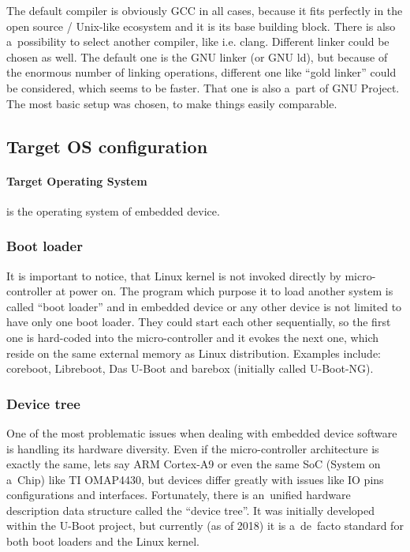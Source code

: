 \documentclass[printmode]{mgr}
\begin{document}
The default compiler is obviously GCC in all cases, because it fits perfectly in the open source / Unix-like ecosystem and it is its base building block. There is also a~possibility to select another compiler, like i.e. clang. Different linker could be chosen as well. The default one is the GNU linker (or GNU ld), but because of the enormous number of linking operations, different one like ``gold linker'' could be considered, which seems to be faster. That one is also a~part of GNU Project. The most basic setup was chosen, to make things easily comparable. 


\subsection{Target OS configuration}

\paragraph{Target Operating System} is the operating system of embedded device.

\subsubsection{Boot loader}
It is important to notice, that Linux kernel is not invoked directly by micro-controller at power on. The program which purpose it to load another system is called ``boot loader'' and in embedded device or any other device is not limited to have only one boot loader. They could start each other sequentially, so the first one is hard-coded into the micro-controller and it evokes the next one, which reside on the same external memory as Linux distribution. Examples include: coreboot, Libreboot, Das U-Boot and barebox (initially called U-Boot-NG).

\subsubsection{Device tree}
One of the most problematic issues when dealing with embedded device software is handling its hardware diversity. Even if the micro-controller architecture is exactly the same, lets say ARM Cortex-A9 or even the same SoC (System on a~Chip) like TI OMAP4430, but devices differ greatly with issues like IO pins configurations and interfaces. Fortunately, there is an~unified hardware description data structure called the ``device tree''. It was initially developed within the U-Boot project, but currently (as of 2018) it is a~de~facto standard for both boot loaders and the Linux kernel.
\end{document}
